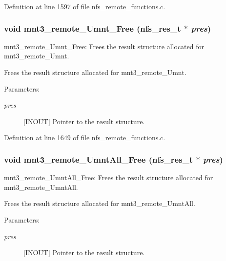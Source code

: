 Definition at line 1597 of file nfs\_\-remote\_\-functions.c.
\subsubsection[{mnt3\_\-remote\_\-Umnt\_\-Free}]{\setlength{\rightskip}{0pt plus 5cm}void mnt3\_\-remote\_\-Umnt\_\-Free (nfs\_\-res\_\-t $\ast$ {\em pres})}\label{group__NFSprocs_g2d3f33d242833d1e1defb036fc190dc0}


mnt3\_\-remote\_\-Umnt\_\-Free: Frees the result structure allocated for mnt3\_\-remote\_\-Umnt.

Frees the result structure allocated for mnt3\_\-remote\_\-Umnt.

\begin{Desc}
\item[Parameters:]
\begin{description}
\item[{\em pres}][INOUT] Pointer to the result structure. \end{description}
\end{Desc}


Definition at line 1649 of file nfs\_\-remote\_\-functions.c.
\subsubsection[{mnt3\_\-remote\_\-UmntAll\_\-Free}]{\setlength{\rightskip}{0pt plus 5cm}void mnt3\_\-remote\_\-UmntAll\_\-Free (nfs\_\-res\_\-t $\ast$ {\em pres})}\label{group__NFSprocs_gd810cd16dfb6caa29f284d5665c41eaf}


mnt3\_\-remote\_\-UmntAll\_\-Free: Frees the result structure allocated for mnt3\_\-remote\_\-UmntAll.

Frees the result structure allocated for mnt3\_\-remote\_\-UmntAll.

\begin{Desc}
\item[Parameters:]
\begin{description}
\item[{\em pres}][INOUT] Pointer to the result structure. \end{description}
\end{Desc}



